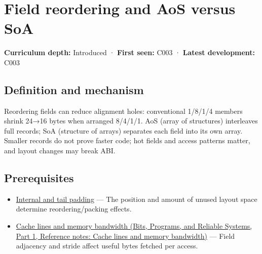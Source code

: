 \hypertarget{appendix-5522ad176ca0}{}\label{referencestart:appendix-5522ad176ca0}
\section{Field reordering and AoS versus SoA}\label{appendix-5522ad176ca0-field-reordering-and-aos-versus-soa}

\hypertarget{appendix-5522ad176ca0-field-reordering-and-aos-versus-soa}{}

\textbf{Curriculum depth:} Introduced · \textbf{First seen:} C003 · \textbf{Latest development:} C003

\begin{allmightroledefinition}

\subsection{Definition and mechanism}\label{appendix-5522ad176ca0-definition-and-mechanism}

\hypertarget{appendix-5522ad176ca0-definition-and-mechanism}{}

Reordering fields can reduce alignment holes: conventional 1/8/1/4 members shrink 24→16 bytes when arranged 8/4/1/1. AoS (array of structures) interleaves full records; SoA (structure of arrays) separates each field into its own array. Smaller records do not prove faster code; hot fields and access patterns matter, and layout changes may break ABI.

\end{allmightroledefinition}

\subsection{Prerequisites}\label{appendix-5522ad176ca0-prerequisites}

\hypertarget{appendix-5522ad176ca0-prerequisites}{}

\begin{itemize}
\tightlist
\item
  \hyperref[appendix-f52f8c5a3afd]{Internal and tail padding} --- The position and amount of unused layout space determine reordering/packing effects.
\item
  \href{../01-Bits-Programs-and-Reliable-Systems-P01/main.pdf\#nameddest=appendix-e4ccdbab8320}{Cache lines and memory bandwidth (Bits, Programs, and Reliable Systems, Part 1, Reference notes: Cache lines and memory bandwidth)} --- Field adjacency and stride affect useful bytes fetched per access.
\end{itemize}

